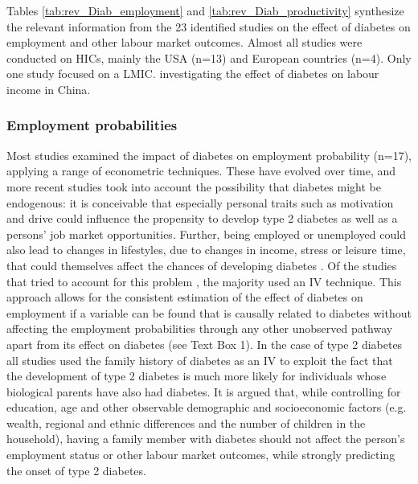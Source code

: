 Tables \ref{tab:rev_Diab_employment} and \ref{tab:rev_Diab_productivity} synthesize the relevant information from the 23 identified studies on the effect of diabetes on employment and other labour market outcomes. Almost all studies were conducted on \acp{HIC}, mainly the USA (n=13) and European countries (n=4). Only one study focused on a \ac{LMIC}. investigating the effect of diabetes on labour income in China.

\subsubsection{Employment probabilities}
Most studies examined the impact of diabetes on employment probability (n=17), applying a range of econometric techniques. These have evolved over time, and more recent studies took into account the possibility that diabetes might be endogenous: it is conceivable that especially personal traits such as motivation and drive could influence the propensity to develop type 2 diabetes as well as a persons' job market opportunities. Further, being employed or unemployed could also lead to changes in lifestyles, due to changes in income, stress or leisure time, that could themselves affect the chances of developing diabetes \parencite{Brown2005}. Of the studies that tried to account for this problem \parencite{Brown2005,Minor2011,Latif2009,Lin2011b,Zhang2009,Harris2009}, the majority used an \ac{IV} technique. This approach allows for the consistent estimation of the effect of diabetes on employment if a variable can be found that is causally related to diabetes without affecting the employment probabilities through any other unobserved pathway apart from its effect on diabetes (see Text Box 1). In the case of type 2 diabetes all studies used the family history of diabetes as an \ac{IV} to exploit the fact that the development of type 2 diabetes is much more likely for individuals whose biological parents have also had diabetes. It is argued that, while controlling for education, age and other observable demographic and socioeconomic factors (e.g. wealth, regional and ethnic differences and the number of children in the household), having a family member with diabetes should not affect the person's employment status or other labour market outcomes, while strongly predicting the onset of type 2 diabetes. 

